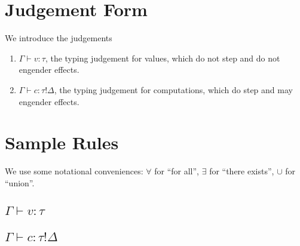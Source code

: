 \documentclass[12pt]{article}
\begin{document}
\newpage
\section{Judgement Form}

We introduce the judgements
\begin{enumerate}
\item $\Gamma \vdash v : \tau$, the typing judgement for values, which do not
step and do not engender effects.
\item $\Gamma \vdash c : \tau!\Delta$, the typing judgement for computations,
which do step and may engender effects.
\end{enumerate}

\newpage
\section{Sample Rules}

We use some notational conveniences: $\forall$ for ``for all'', $\exists$ for
``there exists'', $\cup$ for ``union''.

\subsection{$\Gamma \vdash v : \tau$}

\begin{mathpar}





\end{mathpar}

\subsection{$\Gamma \vdash c : \tau!\Delta$}
\end{document}
